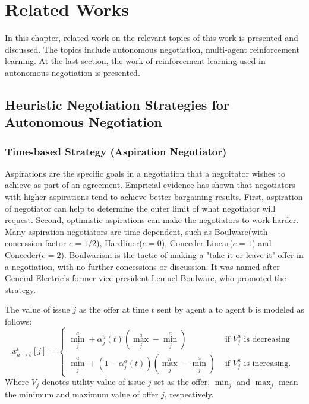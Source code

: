 \chapter{Related Works}
In this chapter, related work on the relevant topics of this work is presented and discussed. The topics include autonomous negotiation, multi-agent reinforcement learning. At the last section, the work of reinforcement learning used in autonomous negotiation is presented. 

\section{Heuristic Negotiation Strategies for Autonomous Negotiation}
\subsection{Time-based Strategy (Aspiration Negotiator)}
Aspirations are the specific goals in a negotiation that a negoitator wishes to achieve as part of an agreement. Empricial evidence has shown that negotiators with higher aspirations tend to achieve better bargaining results. First, aspiration of negotiator can help to determine the outer limit of what negotiator will request. Second, optimistic aspirations can make the negotiators to work harder\parencite{Schneider2004}. Many aspiration negotiators are time dependent, such as Boulware(with concession factor $e=1/2$), Hardliner($e=0$), Conceder Linear($e=1$) and Conceder($e=2$)\parencite{FARATIN1998159}. Boulwarism is the tactic of making a "take-it-or-leave-it" offer in a negotiation, with no further concessions or discussion. It was named after General Electric's former vice president Lemuel Boulware, who promoted the strategy\parencite{William1991}.

The value of issue $j$ as the offer at time $t$ sent by agent a to agent b is modeled as follows:
\begin{equation}
x_{a \rightarrow b}^{t}[j]=\left\{\begin{array}{ll}
\min _{j}^{a}+\alpha_{j}^{a}(t)\left(\max _{j}^{a}-\min _{j}^{a}\right) & \text { if } V_{j}^{a} \text { is decreasing } \\
\min _{j}^{a}+\left(1-\alpha_{j}^{a}(t)\right)\left(\max _{j}^{a}-\min _{j}^{a}\right) & \text { if } V_{j}^{a} \text { is increasing. }
\end{array}\right.
\end{equation}
Where $V_{j}$ denotes utility value of issue $j$ set as the offer, $\min _{j}$ and $\max _{j}$ mean the minimum and maximum value of offer $j$, respectively.

